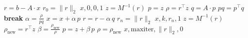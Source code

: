 

\begin{algorithmic}
\State $r = b - A \cdot x$                                          %
\State $r_0 = \lVert r \rVert_2$                                    %
    \Return $x, 0, 0, 1$
\EndIf
\State $z = M^{-1}(r)$                                              %
\State $p = z$                                                      %
\State $\rho = r^\top z$                                            %
    \State $q = A \cdot p$                                          %
    \State $pq = p^\top q$                                          %
        \State \textbf{break}
    \EndIf
    \State $\alpha = \frac{\rho}{pq}$                               %
    \State $x = x + \alpha \, p$                                    %
    \State $r = r - \alpha \, q$                                    %
    \State $r_n = \lVert r \rVert_2$                                %
        \Return $x, k, r_n, 1$
    \EndIf
    \State $z = M^{-1}(r)$                                          %
    \State $\rho_{\text{new}} = r^\top z$                           %
    \State $\beta = \frac{\rho_{\text{new}}}{\rho}$                 %
    \State $p = z + \beta \, p$                                     %
    \State $\rho = \rho_{\text{new}}$                               %
\EndFor
\Return $x, \text{maxiter}, \lVert r \rVert_2, 0$
\end{algorithmic}
